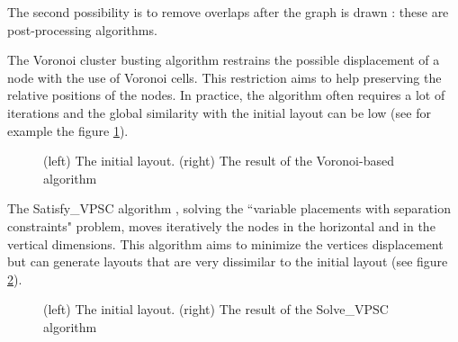 \documentclass[12pt]{report}
\begin{document}
\bigskip
The second possibility is to remove overlaps after the graph is drawn : these are post-processing algorithms.

The Voronoi cluster busting algorithm \cite{Gansner98} restrains the possible displacement of a node with the use of Voronoi cells. This restriction aims to help preserving the relative positions of the nodes. In practice, the algorithm often requires a lot of iterations and the global similarity with the initial layout can be low (see for example the figure \ref{voronoi}).

\begin{figure}[h]
  \setlength\fboxsep{5pt}
  \setlength\fboxrule{0.5pt}
  \caption{(left) The initial layout. (right) The result of the Voronoi-based algorithm}
  \label{voronoi}
\end{figure}

The Satisfy\_VPSC algorithm \cite{VPSC06}, solving the ``variable placements with separation constraints" problem, moves iteratively the nodes in the horizontal and in the vertical dimensions. This algorithm aims to minimize the vertices displacement but can generate layouts that are very dissimilar to the initial layout (see figure \ref{vpsc}).

\begin{figure}[h]
	\center
  \setlength\fboxsep{5pt}
  \setlength\fboxrule{0.5pt}
  \caption{(left) The initial layout. (right) The result of the Solve\_VPSC algorithm}
  \label{vpsc}
\end{figure}
\end{document}
